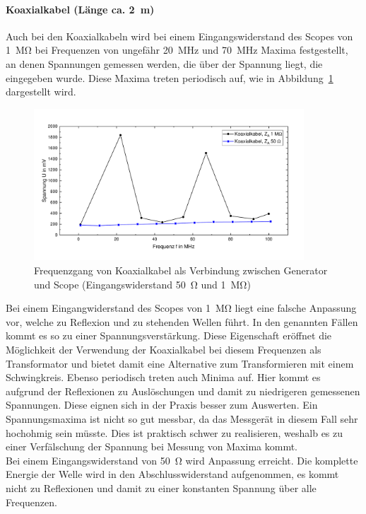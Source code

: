 \documentclass[a4paper,twoside,final]{article}
\begin{document}
\paragraph{Koaxialkabel (Länge ca. \SI{2}{\metre})}
Auch bei den Koaxialkabeln wird bei einem Eingangswiderstand des Scopes von \SI{1}{\mega\ohm} bei Frequenzen von ungefähr \SI{20}{\mega\hertz} und \SI{70}{\mega\hertz} Maxima festgestellt, an denen Spannungen gemessen werden, die über der Spannung liegt, die eingegeben wurde. Diese Maxima treten periodisch auf, wie in Abbildung~\ref{fig:Frequenzverlauf_Koaxialkabel} dargestellt wird.
\begin{figure}[htp]
    \centering
    \vspace{-0.5cm}
        \includegraphics[width=0.9\textwidth]{Bilder/Koaxialkabel_50_1MOhm.pdf}
        \vspace{-0.25cm}
    \caption{Frequenzgang von Koaxialkabel als Verbindung zwischen Generator und Scope (Eingangswiderstand \SI{50}{\ohm} und \SI{1}{\mega\ohm})}
    \label{fig:Frequenzverlauf_Koaxialkabel}
\end{figure}
Bei einem Eingangwiderstand des Scopes von \SI{1}{\mega\ohm} liegt eine falsche Anpassung vor, welche zu Reflexion und zu stehenden Wellen führt. In den genannten Fällen kommt es so zu einer Spannungsverstärkung. Diese Eigenschaft eröffnet die Möglichkeit der Verwendung der Koaxialkabel bei diesem Frequenzen als Transformator und bietet damit eine Alternative zum Transformieren mit einem Schwingkreis.
Ebenso periodisch treten auch Minima auf. Hier kommt es aufgrund der Reflexionen zu Auslöschungen und damit zu niedrigeren gemessenen Spannungen. Diese eignen sich in der Praxis besser zum Auswerten. Ein Spannungsmaxima ist nicht so gut messbar, da das Messgerät in diesem Fall sehr hochohmig sein müsste. Dies ist praktisch schwer zu realisieren, weshalb es zu einer Verfälschung der Spannung bei Messung von Maxima kommt.\\
Bei einem Eingangswiderstand von \SI{50}{\ohm} wird Anpassung erreicht. Die komplette Energie der Welle wird in den Abschlusswiderstand aufgenommen, es kommt nicht zu Reflexionen und damit zu einer konstanten Spannung über alle Frequenzen.
\end{document}

